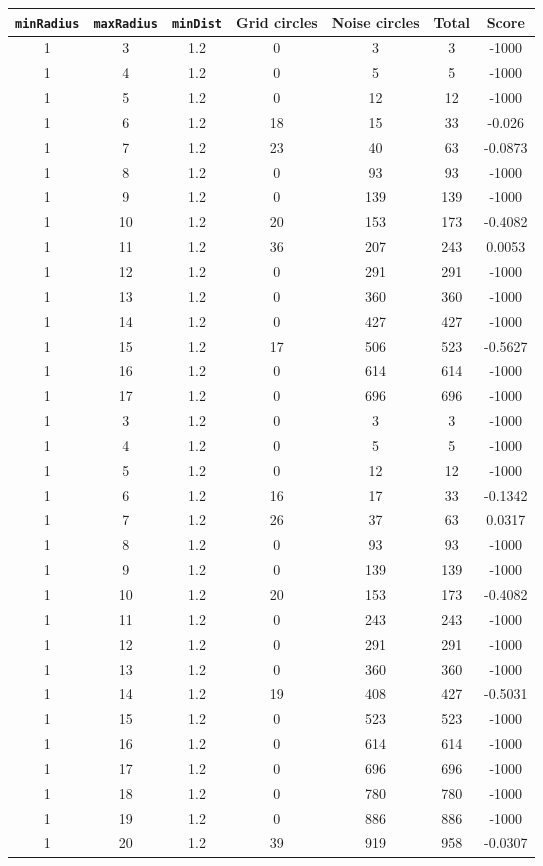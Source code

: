 \documentclass[letterpaper, 12pt]{article}
\begin{document}
\begin{longtable}{|c|c|c|c|c|c|c|}
\hline
\textbf{\texttt{minRadius}} & \textbf{\texttt{maxRadius}} & \textbf{\texttt{minDist}} & \textbf{Grid circles} & \textbf{Noise circles} & \textbf{Total} & \textbf{Score} \\
\hline
1 & 3 & 1.2 & 0 & 3 & 3 & -1000 \\
\hline
1 & 4 & 1.2 & 0 & 5 & 5 & -1000 \\
\hline
1 & 5 & 1.2 & 0 & 12 & 12 & -1000 \\
\hline
1 & 6 & 1.2 & 18 & 15 & 33 & -0.026 \\
\hline
1 & 7 & 1.2 & 23 & 40 & 63 & -0.0873 \\
\hline
1 & 8 & 1.2 & 0 & 93 & 93 & -1000 \\
\hline
1 & 9 & 1.2 & 0 & 139 & 139 & -1000 \\
\hline
1 & 10 & 1.2 & 20 & 153 & 173 & -0.4082 \\
\hline
1 & 11 & 1.2 & 36 & 207 & 243 & 0.0053 \\
\hline
1 & 12 & 1.2 & 0 & 291 & 291 & -1000 \\
\hline
1 & 13 & 1.2 & 0 & 360 & 360 & -1000 \\
\hline
1 & 14 & 1.2 & 0 & 427 & 427 & -1000 \\
\hline
1 & 15 & 1.2 & 17 & 506 & 523 & -0.5627 \\
\hline
1 & 16 & 1.2 & 0 & 614 & 614 & -1000 \\
\hline
1 & 17 & 1.2 & 0 & 696 & 696 & -1000 \\
\hline
1 & 3 & 1.2 & 0 & 3 & 3 & -1000 \\
\hline
1 & 4 & 1.2 & 0 & 5 & 5 & -1000 \\
\hline
1 & 5 & 1.2 & 0 & 12 & 12 & -1000 \\
\hline
1 & 6 & 1.2 & 16 & 17 & 33 & -0.1342 \\
\hline
1 & 7 & 1.2 & 26 & 37 & 63 & 0.0317 \\
\hline
1 & 8 & 1.2 & 0 & 93 & 93 & -1000 \\
\hline
1 & 9 & 1.2 & 0 & 139 & 139 & -1000 \\
\hline
1 & 10 & 1.2 & 20 & 153 & 173 & -0.4082 \\
\hline
1 & 11 & 1.2 & 0 & 243 & 243 & -1000 \\
\hline
1 & 12 & 1.2 & 0 & 291 & 291 & -1000 \\
\hline
1 & 13 & 1.2 & 0 & 360 & 360 & -1000 \\
\hline
1 & 14 & 1.2 & 19 & 408 & 427 & -0.5031 \\
\hline
1 & 15 & 1.2 & 0 & 523 & 523 & -1000 \\
\hline
1 & 16 & 1.2 & 0 & 614 & 614 & -1000 \\
\hline
1 & 17 & 1.2 & 0 & 696 & 696 & -1000 \\
\hline
1 & 18 & 1.2 & 0 & 780 & 780 & -1000 \\
\hline
1 & 19 & 1.2 & 0 & 886 & 886 & -1000 \\
\hline
1 & 20 & 1.2 & 39 & 919 & 958 & -0.0307 \\
\hline
\end{longtable}
\end{document}
